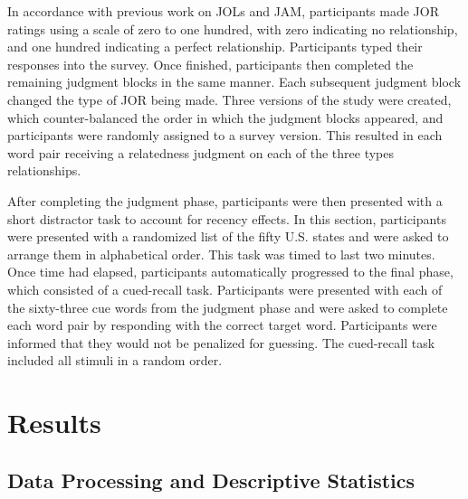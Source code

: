 \documentclass[english,,man]{apa6}
\begin{document}
In accordance with previous work on JOLs and JAM, participants made JOR ratings using a scale of zero to one hundred, with zero indicating no relationship, and one hundred indicating a perfect relationship. Participants typed their responses into the survey. Once finished, participants then completed the remaining judgment blocks in the same manner. Each subsequent judgment block changed the type of JOR being made. Three versions of the study were created, which counter-balanced the order in which the judgment blocks appeared, and participants were randomly assigned to a survey version. This resulted in each word pair receiving a relatedness judgment on each of the three types relationships.

After completing the judgment phase, participants were then presented with a short distractor task to account for recency effects. In this section, participants were presented with a randomized list of the fifty U.S. states and were asked to arrange them in alphabetical order. This task was timed to last two minutes. Once time had elapsed, participants automatically progressed to the final phase, which consisted of a cued-recall task. Participants were presented with each of the sixty-three cue words from the judgment phase and were asked to complete each word pair by responding with the correct target word. Participants were informed that they would not be penalized for guessing. The cued-recall task included all stimuli in a random order.

\hypertarget{results}{%
\section{Results}\label{results}}

\hypertarget{data-processing-and-descriptive-statistics}{%
\subsection{Data Processing and Descriptive Statistics}\label{data-processing-and-descriptive-statistics}}
\end{document}
